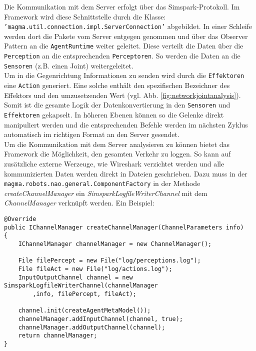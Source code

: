 Die Kommunikation mit dem Server erfolgt über das Simspark-Protokoll. Im Framework wird diese Schnittstelle durch die Klasse:\\ \texttt{'magma.util.connection.impl.ServerConnection'} abgebildet. In einer Schleife werden dort die Pakete vom Server entgegen genommen und über das Observer Pattern an die \texttt{AgentRuntime} weiter geleitet. Diese verteilt die Daten über die \texttt{Perception} an die entsprechenden \texttt{Perceptoren}. So werden die Daten an die \texttt{Sensoren} (z.B. einen Joint) weitergeleitet.\\
Um in die Gegenrichtung Informationen zu senden wird durch die \texttt{Effektoren} eine \texttt{Action} generiert. Eine solche enthält den spezifischen Bezeichner des Effektors und den umzusetzenden Wert (vgl. Abb. \ref{fig:networkjointanalysis}).\\
Somit ist die gesamte Logik der Datenkonvertierung in den \texttt{Sensoren} und \texttt{Effektoren} gekapselt. In höheren Ebenen können so die Gelenke direkt manipuliert werden und die entsprechenden Befehle werden im nächsten Zyklus automatisch im richtigen Format an den Server gesendet.\\

Um die Kommunikation mit dem Server analysieren zu können bietet das Framework die Möglichkeit, den gesamten Verkehr zu loggen. So kann auf zusätzliche externe Werzeuge, wie Wireshark verzichtet werden und alle kommunizierten Daten werden direkt in Dateien geschrieben. Dazu muss in der \texttt{magma.robots.nao.general.ComponentFactory} in der Methode \textit{createChannelManager} ein \textit{SimsparkLogfileWriterChannel} mit dem \textit{ChannelManager} verknüpft werden. Ein Beispiel:\\

\begin{lstlisting}[caption=Loggen der Kommunikation, captionpos=b, label=lst:com-log]
@Override
public IChannelManager createChannelManager(ChannelParameters info)
{
	IChannelManager channelManager = new ChannelManager();

	File filePercept = new File("log/perceptions.log");
	File fileAct = new File("log/actions.log");
	InputOutputChannel channel = new SimsparkLogfileWriterChannel(channelManager
		,info, filePercept, fileAct);

	channel.init(createAgentMetaModel());
	channelManager.addInputChannel(channel, true);
	channelManager.addOutputChannel(channel);
	return channelManager;
}
\end{lstlisting}